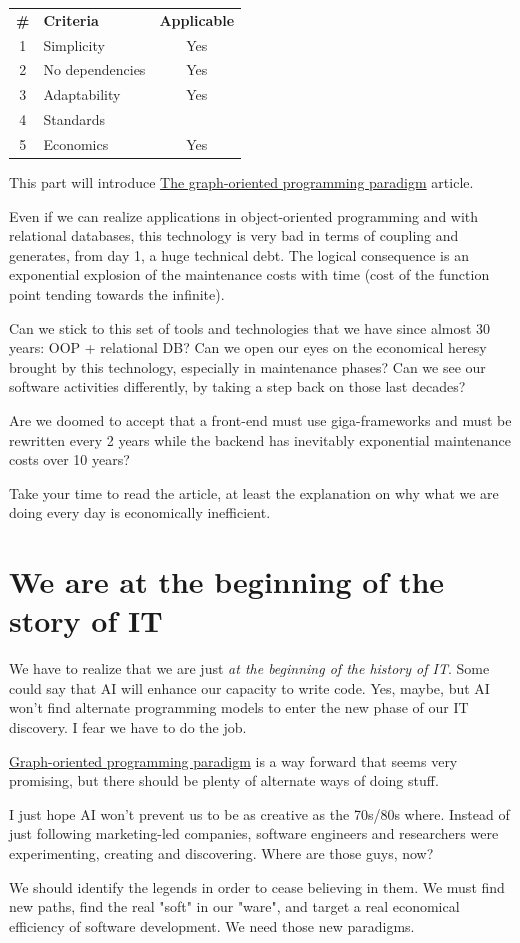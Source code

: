 \documentclass[]{article}
\newcommand{\criterias}[5]
{\begin{center}
\rowcolors{2}{gray!25}{white}
{\small\begin{tabular}{clc}
\rowcolor{gray!50}
\textbf{\#} & \textbf{Criteria} & \textbf{Applicable} \\
1 & Simplicity      & #1 \\
2 & No dependencies & #2 \\
3 & Adaptability    & #3 \\
4 & Standards       & #4 \\
5 & Economics       & #5 \\
\end{tabular}}
\end{center}}
\begin{document}
\criterias{Yes}{Yes}{Yes}{}{Yes}

This part will introduce \href{https://orey.github.io/papers/pdf/20161026-TheGraphOrientedProgrammingParadigm-ORey-PreliminaryVersion.pdf}{The graph-oriented programming paradigm} article.

Even if we can realize applications in object-oriented programming and with relational databases, this technology is very bad in terms of coupling and generates, from day 1, a huge technical debt. The logical consequence is an exponential explosion of the maintenance costs with time (cost of the function point tending towards the infinite).

Can we stick to this set of tools and technologies that we have since almost 30 years: OOP + relational DB? Can we open our eyes on the economical heresy brought by this technology, especially in maintenance phases? Can we see our software activities differently, by taking a step back on those last decades?

Are we doomed to accept that a front-end must use giga-frameworks and must be rewritten every 2 years while the backend has inevitably exponential maintenance costs over 10 years?

Take your time to read the article, at least the explanation on why what we are doing every day is economically inefficient.

\section{We are at the beginning of the story of IT}

We have to realize that we are just \emph{at the beginning of the history of IT}. Some could say that AI will enhance our capacity to write code. Yes, maybe, but AI won't find alternate programming models to enter the new phase of our IT discovery. I fear we have to do the job.

\href{https://orey.github.io/papers/pdf/20161026-TheGraphOrientedProgrammingParadigm-ORey-PreliminaryVersion.pdf}{Graph-oriented programming paradigm} is a way forward that seems very promising, but there should be plenty of alternate ways of doing stuff.

I just hope AI won't prevent us to be as creative as the 70s/80s where. Instead of just following marketing-led companies, software engineers and researchers were experimenting, creating and discovering. Where are those guys, now?

We should identify the legends in order to cease believing in them. We must find new paths, find the real "soft" in our "ware", and target a real economical efficiency of software development. We need those new paradigms.
\end{document}
